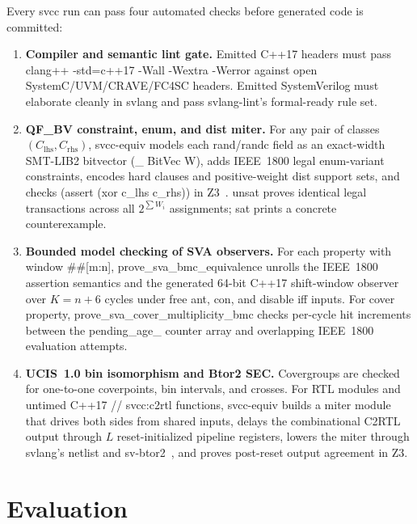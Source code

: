 \documentclass[conference]{IEEEtran}
\newcommand{\code}[1]{{\fontshape{n}\ttfamily #1}}
\begin{document}
Every \code{svcc} run can pass four automated checks before generated code is committed:
\begin{enumerate}
\item \textbf{Compiler and semantic lint gate.} Emitted C++17 headers must pass \code{clang++ -std=c++17 -Wall -Wextra -Werror} against open SystemC/UVM/CRAVE/FC4SC headers. Emitted SystemVerilog must elaborate cleanly in \code{svlang} and pass \code{svlang-lint}'s \code{formal-ready} rule set.
\item \textbf{\code{QF\_BV} constraint, enum, and \code{dist} miter.} For any pair of classes $(C_{\text{lhs}}, C_{\text{rhs}})$, \code{svcc-equiv} models each \code{rand}/\code{randc} field as an exact-width SMT-LIB2 bitvector \code{(\_ BitVec W)}, adds IEEE~1800 legal enum-variant constraints, encodes hard clauses and positive-weight \code{dist} support sets, and checks \code{(assert (xor c\_lhs c\_rhs))} in Z3~\cite{demoura2008z3}. \code{unsat} proves identical legal transactions across all $2^{\sum W_i}$ assignments; \code{sat} prints a concrete counterexample.
\item \textbf{Bounded model checking of SVA observers.} For each property with window \code{\#\#[m:n]}, \code{prove\_sva\_\allowbreak bmc\_\allowbreak equivalence} unrolls the IEEE~1800 assertion semantics and the generated 64-bit C++17 shift-window observer over $K = n + 6$ cycles under free \code{ant}, \code{con}, and \code{disable iff} inputs. For \code{cover property}, \code{prove\_sva\_\allowbreak cover\_\allowbreak multiplicity\_\allowbreak bmc} checks per-cycle hit increments between the \code{pending\_age\_} counter array and overlapping IEEE~1800 evaluation attempts.
\item \textbf{UCIS~1.0 bin isomorphism and Btor2 SEC.} Covergroups are checked for one-to-one coverpoints, bin intervals, and crosses. For RTL modules and untimed C++17 \code{// svcc:c2rtl} functions, \code{svcc-equiv} builds a miter module that drives both sides from shared inputs, delays the combinational C2RTL output through $L$ reset-initialized pipeline registers, lowers the miter through \code{svlang}'s netlist and \code{sv-btor2}~\cite{niemetz2018btor2,kubavat2026svlang}, and proves post-reset output agreement in Z3.
\end{enumerate}

\section{Evaluation}
\label{sec:eval}
\end{document}
